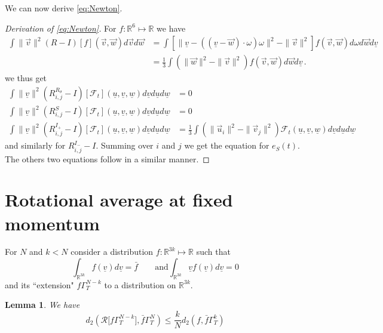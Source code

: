 \documentclass{article}
\newcommand{\scrF}{{\mathscr F}}
\newcommand \ul[1]{\underline{#1}}
\newcommand*\R{ \mathds{R} }
\newcommand\uv{{\underline v}}
\newcommand\vv{{\vec v}}
\newcommand\vu{{\vec u}}
\newcommand\vw{{\vec w}}
\newtheorem{mylemma}[mythm]{Lemma}
\begin{document}
We can now derive \eqref{eq:Newton}.

\begin{proof}[Derivation of \eqref{eq:Newton}] For $f:\mathds R^6\mapsto \mathds R$ we have
\[
\begin{aligned}
	\int\|\vv\|^2(R-I)[f](\vv,\vw)d\vv d\vw &=
	\int \left[\|\uv-((\uv-\vw)\cdot\omega)\omega\|^2-\|\vv\|^2\right]
	f(\vv,\vw)d\omega d\vw d\uv\\
	&= \frac 13\int ( \|\vw\|^2- \|\vv\|^2)f(\vv,\vw) d\vw d\uv \, .
\end{aligned}
\]
we thus get
	\[
\begin{aligned}
	\int\|\uv\|^2 (R_{i,j}^{R_\sigma}-I)[\scrF_t](\ul u,\ul v,\ul w)d\ul vd\ul u d\ul w&=0\\
	\int\|\uv\|^2 (R_{i,j}^{S}-I)[\scrF_t](\ul u,\ul v,\ul w)d\ul vd\ul u d\ul w&=0\\
	\int\|\uv\|^2 (R_{i,j}^{I_+}-I)[\scrF_t](\ul u,\ul v,\ul w)d\ul vd\ul u d\ul w&=
	\frac13\int(\|\vu_i\|^2-\|\vv_j\|^2) \scrF_t(\ul u,\ul v,\ul w)d\ul vd\ul u d\ul w
\end{aligned}
\]
and similarly for $R_{i,j}^{I_-}-I$. Summing over $i$ and $j$ we get the equation for $e_S(t)$. The others two
equations follow in a similar manner.
\end{proof}



\section{Rotational average at fixed momentum}
\label{app:SteadyStates}


For $N$ and $k<N$ consider a distribution $f:\R^{3k}\mapsto \R$ such that
\[
\int_{\R^{3k}}f(\ul v)d\ul v=\bar f \qquad\mathrm{and}\int_{\R^{3k}}\ul vf(\ul v)d\ul v=0
\]
and its ``extension" $f\Gamma^{N-k}_T$ to a distribution on $\R^{3k}$.
\begin{mylemma}\label{lem:rota}
We have
\[
d_2\left(\mathcal R\bigl[f\Gamma^{N-k}_T\bigr],\bar f\Gamma^N_T\right)\leq \frac kN d_2(f,\bar f\Gamma^k_T)
\]
\end{mylemma}
\end{document}

